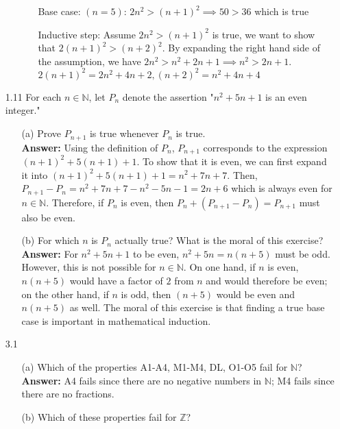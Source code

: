 \documentclass{article}
\begin{document}
\begin{itemize}
\begin{itemize}
\begin{itemize}
                              \item [] Base case: $(n=5)$: $2n^2>(n+1)^2\implies 50>36$ which is true
                              \item [] Inductive step: Assume $2n^2>(n+1)^2$ is true, we want to show that $2(n+1)^2>(n+2)^2$. By expanding the right hand side of the assumption, we have $2n^2>n^2+2n+1\implies n^2>2n+1$. $2(n+1)^2=2n^2+4n+2, (n+2)^2=n^2+4n+4$
                        \end{itemize}

            \end{itemize}
      \item [1.11] For each $n\in\mathbb{N}$, let $P_n$ denote the assertion "$n^2+5n+1$ is an even integer."
            \begin{itemize}
                  \item [(a)] Prove $P_{n+1}$ is true whenever $P_n$ is true.\\
                        \textbf{Answer: } Using the definition of $P_n$, $P_{n+1}$ corresponds to the expression $(n+1)^2+5(n+1)+1$. To show that it is even, we can first expand it into $(n+1)^2+5(n+1)+1=n^2+7n+7$. Then, $P_{n+1}-P_n=n^2+7n+7-n^2-5n-1=2n+6$ which is always even for $n\in\mathbb{N}$. Therefore, if $P_n$ is even, then $P_n+(P_{n+1}-P_n)=P_{n+1}$ must also be even.
                  \item [(b)] For which $n$ is $P_n$ actually true? What is the moral of this exercise?\\
                        \textbf{Answer: } For $n^2+5n+1$ to be even, $n^2+5n=n(n+5)$ must be odd. However, this is not possible for $n\in\mathbb{N}$. On one hand, if $n$ is even, $n(n+5)$ would have a factor of $2$ from $n$ and would therefore be even; on the other hand, if $n$ is odd, then $(n+5)$ would be even and $n(n+5)$ as well. The moral of this exercise is that finding a true base case is important in mathematical induction.
            \end{itemize}
      \item [3.1]
            \begin{itemize}
                  \item [(a)] Which of the properties A1-A4, M1-M4, DL, O1-O5 fail for $\mathbb{N}$?\\
                        \textbf{Answer: } A4 fails since there are no negative numbers in $\mathbb{N}$; M4 fails since there are no fractions.
                  \item [(b)] Which of these properties fail for $\mathbb{Z}$?\\

\end{itemize}
\end{itemize}
\end{document}

